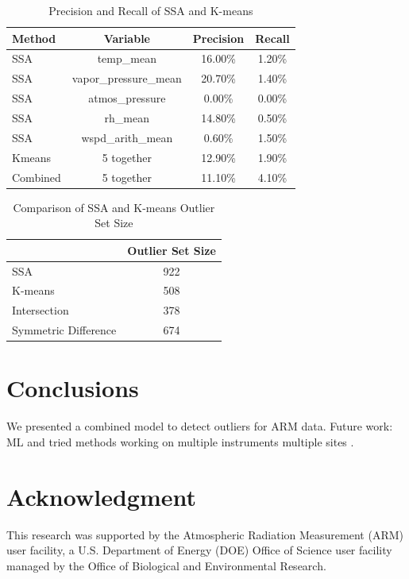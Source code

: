 \documentclass[letterpaper, 10 pt, conference]{ieeeconf}  %
\begin{document}
\begin{table}[ht]
\caption{Precision and Recall of SSA and K-means}
\label{tab:pr}
\centering
\begin{tabular}{|l|c|c|c|}
\hline
Method & Variable & Precision & Recall\\
\hline
SSA & temp\_mean & 16.00\% & 1.20\%\\
SSA & vapor\_pressure\_mean & 20.70\% & 1.40\%\\
SSA & atmos\_pressure & 0.00\% & 0.00\%\\
SSA & rh\_mean & 14.80\% & 0.50\%\\
SSA & wspd\_arith\_mean & 0.60\% & 1.50\%\\
Kmeans & 5 together & 12.90\% & 1.90\%\\
Combined & 5 together & 11.10\% & 4.10\%\\
\hline
\end{tabular}
\end{table}

\begin{table}[ht]
\caption{Comparison of SSA and K-means Outlier Set Size}
\label{tab:comp}
\centering
\begin{tabular}{|l|c|}
\cline{2-2}
\multicolumn{1}{l|}{} & Outlier Set Size\\
\hline
SSA & 922\\
K-means & 508\\
Intersection & 378\\
Symmetric Difference & 674\\
\hline
\end{tabular}
\end{table}

\section{Conclusions}
We presented a combined model to detect outliers for ARM data. Future work: 
ML and tried methods working on multiple instruments multiple sites \cite{phillips2015graph}.


\section*{Acknowledgment}
This research was supported by the Atmospheric Radiation Measurement (ARM) user 
facility, a U.S. Department of Energy (DOE) Office of Science user facility 
managed by the Office of Biological and Environmental Research.


 

\end{document}
